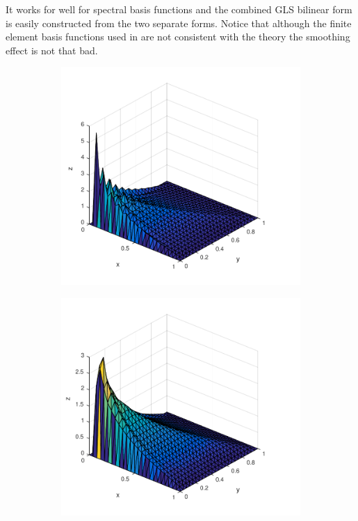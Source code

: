 It works for well for spectral basis functions and the combined GLS bilinear form is easily constructed from the two separate forms. Notice that although the finite element basis functions used in are not consistent with the theory the smoothing effect is not that bad.  
%
\begin{figure}[h]
  \centering
  \begin{subfigure}[b]{0.48\textwidth}
	\includegraphics[width=\textwidth]{Figures/FEM_difftrans_aNeg.pdf}
  \end{subfigure}%
  \quad
  \begin{subfigure}[b]{0.48\textwidth}
	\includegraphics[width=\textwidth]{Figures/GLSFEM_difftrans_aNeg.pdf}

\end{subfigure}
\end{figure}
